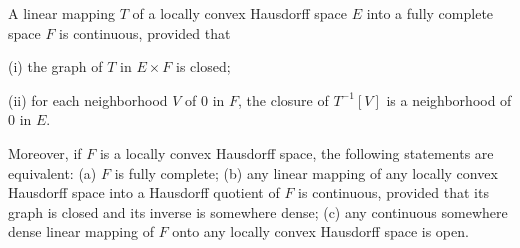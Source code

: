 A linear mapping $T$ of a locally convex Hausdorff space $E$ into a fully complete space $F$ is continuous, provided that

(i) the graph of $T$ in $E \times F$ is closed;

(ii) for each neighborhood $V$ of $0$ in $F$, the closure of $T^{-1}[V]$ is a neighborhood of $0$ in $E$.

Moreover, if $F$ is a locally convex Hausdorff space, the following statements are equivalent:
(a) $F$ is fully complete;
(b) any linear mapping of any locally convex Hausdorff space into a Hausdorff quotient of $F$ is continuous, provided that its graph is closed and its inverse is somewhere dense;
(c) any continuous somewhere dense linear mapping of $F$ onto any locally convex Hausdorff space is open.
